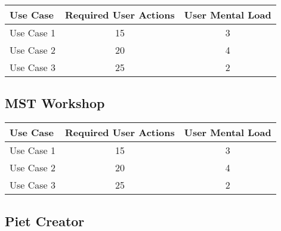 \begin{tabularx}{\textwidth}{Xcc}
\textbf{Use Case} & \textbf{Required User Actions} & \textbf{User Mental Load}\\
\hline
Use Case 1                          & 15 & 3 \\
Use Case 2                          & 20 & 4 \\
Use Case 3                          & 25 & 2
\end{tabularx}

\subsection{MST Workshop}




\begin{tabularx}{\textwidth}{Xcc}
\textbf{Use Case} & \textbf{Required User Actions} & \textbf{User Mental Load}\\
\hline
Use Case 1                          & 15 & 3 \\
Use Case 2                          & 20 & 4 \\
Use Case 3                          & 25 & 2
\end{tabularx}

\subsection{Piet Creator}

